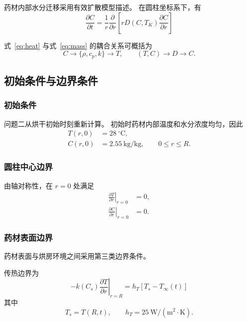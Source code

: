 \documentclass[UTF8,a4paper,12pt]{ctexart}
\begin{document}
药材内部水分迁移采用有效扩散模型描述。
在圆柱坐标系下，有
\begin{equation}
\boxed{
\frac{\partial C}{\partial t}
=
\frac{1}{r}
\frac{\partial}{\partial r}
\left[
rD(C,T_K)
\frac{\partial C}{\partial r}
\right]
}
\label{eq:mass}
\end{equation}

式~\eqref{eq:heat} 与式~\eqref{eq:mass} 的耦合关系可概括为
\begin{equation}
C
\longrightarrow
\{\rho,c_p,k\}
\longrightarrow
T,
\qquad
(T,C)
\longrightarrow
D
\longrightarrow
C.
\end{equation}

\subsection{初始条件与边界条件}

\subsubsection{初始条件}

问题二从烘干初始时刻重新计算。
初始时药材内部温度和水分浓度均匀，因此
\begin{align}
T(r,0)&=28~^\circ\mathrm{C},\\
C(r,0)&=2.55~\mathrm{kg/kg},
\qquad 0\le r\le R.
\end{align}

\subsubsection{圆柱中心边界}

由轴对称性，在 $r=0$ 处满足
\begin{align}
\left.\frac{\partial T}{\partial r}\right|_{r=0}&=0,\\
\left.\frac{\partial C}{\partial r}\right|_{r=0}&=0.
\end{align}

\subsubsection{药材表面边界}

药材表面与烘房环境之间采用第三类边界条件。

传热边界为
\begin{equation}
\boxed{
-k(C_s)
\left.
\frac{\partial T}{\partial r}
\right|_{r=R}
=
h_T\left[T_s-T_{\infty}(t)\right]
}
\label{eq:heatbc}
\end{equation}
其中
\begin{equation}
T_s=T(R,t),\qquad
h_T=25~\mathrm{W/(m^2\cdot K)}.
\end{equation}
\end{document}
